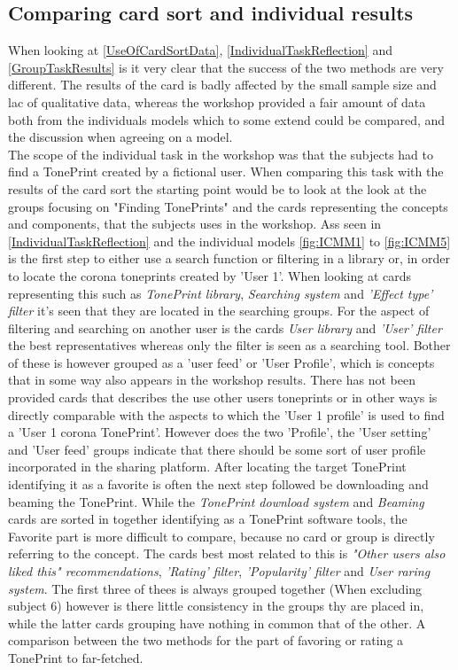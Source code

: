 \subsection*{Comparing card sort and individual results}
\label{ComparingIndividualAndCard}
When looking at \autoref{UseOfCardSortData}, \autoref{IndividualTaskReflection} and \autoref{GroupTaskResults} is it very clear that the success of the two methods are very different. The results of the card is badly affected by the small sample size and lac of qualitative data, whereas the workshop provided a fair amount of data both from the individuals models which to some extend could be compared, and the discussion when agreeing on a model.\\
The scope of the individual task in the workshop was that the subjects had to find a TonePrint created by a fictional user. When comparing this task with the results of the card sort the starting point would be to look at the look at the groups focusing on "Finding TonePrints" and the cards representing the concepts and components, that the subjects uses in the workshop. Ass seen in
\autoref{IndividualTaskReflection} and the individual models \autoref{fig:ICMM1} to \autoref{fig:ICMM5} is the first step to either use a search function or filtering in a library or, in order to locate the corona toneprints created by 'User 1'. When looking at cards representing this such as \textit{TonePrint library}, \textit{Searching system} and \textit{'Effect type' filter} it's seen that they are located in the searching groups. For the aspect of filtering and searching on another user is the cards \textit{User library} and \textit{'User' filter} the best representatives whereas only the filter is seen as a searching tool. Bother of these is however grouped as a 'user feed' or 'User Profile', which is concepts that in some way also appears in the workshop results. There has not been provided cards that describes the use other users toneprints or in other ways is directly comparable with the aspects to which the 'User 1 profile' is used to find a 'User 1 corona TonePrint'. However does the two 'Profile', the 'User setting' and 'User feed' groups indicate that there should be some sort of user profile incorporated in the sharing platform. After locating the target TonePrint identifying it as a favorite is often the next step followed be downloading and beaming the TonePrint. While the \textit{TonePrint download system} and \textit{Beaming} cards are sorted in together identifying as a TonePrint software tools, the Favorite part is more difficult to compare, because no card or group is directly referring to the concept. The cards best most related to this is \textit{"Other users also liked this" recommendations}, \textit{'Rating' filter}, \textit{'Popularity' filter} and \textit{User raring system}. The first three of thees is always grouped together (When excluding subject 6) however is there little consistency in the groups thy are placed in, while the latter cards grouping have nothing in common that of the other. A comparison between the two methods for the part of favoring or rating a TonePrint to far-fetched.

